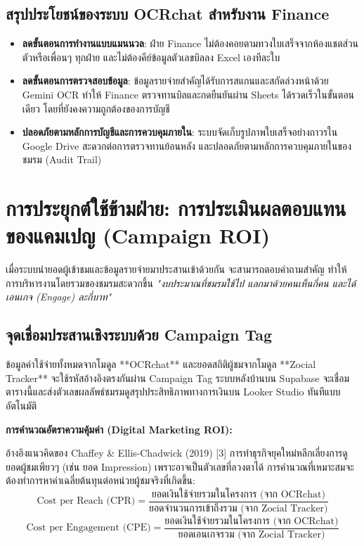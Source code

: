 \documentclass[10pt,a4paper]{article}
\begin{document}
\subsection{สรุปประโยชน์ของระบบ OCRchat สำหรับงาน Finance}
\begin{itemize}
  \item \textbf{ลดขั้นตอนการทำงานแบบแมนนวล}: ฝ่าย Finance ไม่ต้องคอยตามทวงใบเสร็จจากห้องแชตส่วนตัวหรือเพื่อนๆ ทุกฝ่าย และไม่ต้องคีย์ข้อมูลตัวเลขบิลลง Excel เองทีละใบ
  \item \textbf{ลดขั้นตอนการตรวจสอบข้อมูล}: ข้อมูลรายจ่ายสำคัญได้รับการสแกนและสกัดล่วงหน้าด้วย Gemini OCR ทำให้ Finance ตรวจทานบิลและกดยืนยันผ่าน Sheets ได้รวดเร็วในขั้นตอนเดียว โดยที่ยังคงความถูกต้องของการบัญชี
  \item \textbf{ปลอดภัยตามหลักการบัญชีและการควบคุมภายใน}: ระบบจัดเก็บรูปภาพใบเสร็จอย่างถาวรใน Google Drive สะดวกต่อการตรวจทานย้อนหลัง และปลอดภัยตามหลักการควบคุมภายในของชมรม (Audit Trail)
\end{itemize}

\newpage

\section{การประยุกต์ใช้ข้ามฝ่าย: การประเมินผลตอบแทนของแคมเปญ (Campaign ROI)}

\noindent เมื่อระบบนำยอดผู้เข้าชมและข้อมูลรายจ่ายมาประสานเข้าด้วยกัน จะสามารถตอบคำถามสำคัญ ทำให้การบริหารงานโดยรวมของชมรมสะดวกขึ้น \emph{"งบประมาณที่ชมรมใช้ไป แลกมาด้วยคนเห็นกี่คน และได้เอนเกจ (Engage) ละกี่บาท"}

\subsection{จุดเชื่อมประสานเชิงระบบด้วย Campaign Tag}
ข้อมูลค่าใช้จ่ายทั้งหมดจากโมดูล **OCRchat** และยอดสถิติผู้ชมจากโมดูล **Zocial Tracker** จะใช้รหัสอ้างอิงตรงกันผ่าน Campaign Tag ระบบหลังบ้านบน Supabase จะเชื่อมตารางนี้และส่งตัวเลขผลลัพธ์ชมรมดูสรุปประสิทธิภาพทางการเงินบน Looker Studio ทันทีแบบอัตโนมัติ

\begin{highlightbox}
  \noindent \textbf{การคำนวณอัตราความคุ้มค่า (Digital Marketing ROI):}

  อ้างอิงแนวคิดของ Chaffey \& Ellis-Chadwick (2019) [3] การทำธุรกิจยุคใหม่หลีกเลี่ยงการดูยอดผู้ชมเพียวๆ (เช่น ยอด Impression) เพราะอาจเป็นตัวเลขที่ลวงตาได้ การคำนวณที่เหมาะสมจะต้องทำการหาค่าเฉลี่ยต้นทุนต่อหน่วยผู้ชมจริงที่เกิดขึ้น:
  \begin{equation}
    \text{Cost per Reach (CPR)} = \frac{\text{ยอดเงินใช้จ่ายรวมในโครงการ (จาก OCRchat)}}{\text{ยอดจำนวนการเข้าถึงรวม (จาก Zocial Tracker)}}
  \end{equation}
  \begin{equation}
    \text{Cost per Engagement (CPE)} = \frac{\text{ยอดเงินใช้จ่ายรวมในโครงการ (จาก OCRchat)}}{\text{ยอดเอนเกจรวม (จาก Zocial Tracker)}}
  \end{equation}
\end{highlightbox}
\end{document}
